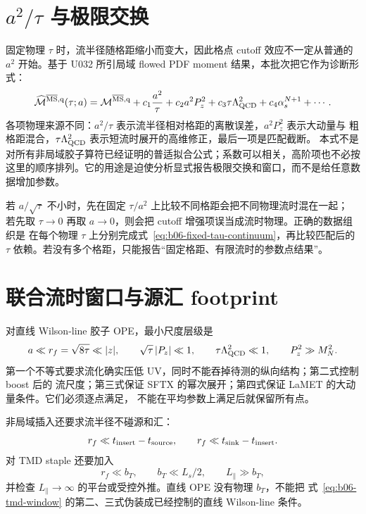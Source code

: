 \section{\texorpdfstring{\(a^2/\tau\) 与极限交换}{a2/tau 与极限交换}}

固定物理 \(\tau\) 时，流半径随格距缩小而变大，因此格点 cutoff 效应不一定从普通的
\(a^2\) 开始。基于 U032 所引局域 flowed PDF moment 结果，本批次把它作为诊断形式：
\begin{equation}
  \widehat{\mathcal M}^{\overline{\mathrm{MS}},{\rm q}}(\tau;a)
  =\mathcal M^{\overline{\mathrm{MS}},{\rm q}}
  +c_1\frac{a^2}{\tau}
  +c_2a^2P_z^2
  +c_3\tau\Lambda_{\rm QCD}^2
  +c_4\alpha_s^{N+1}
  +\cdots .
  \label{eq:b06-cutoff-ansatz}
\end{equation}
各项物理来源不同：\(a^2/\tau\) 表示流半径相对格距的离散误差，\(a^2P_z^2\) 表示大动量与
粗格距混合，\(\tau\Lambda_{\rm QCD}^2\) 表示短流时展开的高维修正，最后一项是匹配截断。
本式不是对所有非局域胶子算符已经证明的普适拟合公式；系数可以相关，高阶项也不必按
这里的顺序排列。它的用途是迫使分析显式报告极限交换和窗口，而不是给任意数据增加参数。

若 \(a/\sqrt\tau\) 不小时，先在固定 \(\tau/a^2\) 上比较不同格距会把不同物理流时混在一起；
若先取 \(\tau\to0\) 再取 \(a\to0\)，则会把 cutoff 增强项误当成流时物理。正确的数据组织是
在每个物理 \(\tau\) 上分别完成式~\eqref{eq:b06-fixed-tau-continuum}，再比较匹配后的
\(\tau\) 依赖。若没有多个格距，只能报告“固定格距、有限流时的参数点结果”。

\section{联合流时窗口与源汇 footprint}

对直线 Wilson-line 胶子 OPE，最小尺度层级是
\begin{equation}
  a\ll r_f=\sqrt{8\tau}\ll |z|,
  \qquad
  \sqrt{\tau}\,|P_z|\ll1,
  \qquad
  \tau\Lambda_{\rm QCD}^2\ll1,
  \qquad
  P_z^2\gg M_N^2 .
  \label{eq:b06-line-window}
\end{equation}
第一个不等式要求流化确实压低 UV，同时不能吞掉待测的纵向结构；第二式控制 boost 后的
流尺度；第三式保证 SFTX 的幂次展开；第四式保证 LaMET 的大动量条件。它们必须逐点满足，
不能在平均参数上满足后就保留所有点。

非局域插入还要求流半径不碰源和汇：
\begin{equation}
  r_f\ll t_{\rm insert}-t_{\rm source},
  \qquad
  r_f\ll t_{\rm sink}-t_{\rm insert}.
  \label{eq:b06-source-sink-footprint}
\end{equation}
对 TMD staple 还要加入
\begin{equation}
  r_f\ll b_T,
  \qquad
  b_T\ll L_s/2,
  \qquad
  L_\parallel\gg b_T,
  \label{eq:b06-tmd-window}
\end{equation}
并检查 \(L_\parallel\to\infty\) 的平台或受控外推。直线 OPE 没有物理 \(b_T\)，不能把
式~\eqref{eq:b06-tmd-window} 的第二、三式伪装成已经控制的直线 Wilson-line 条件。

